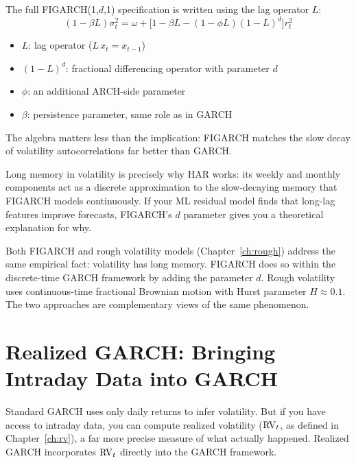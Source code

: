 The full FIGARCH(1,$d$,1) specification is written using the lag operator $L$:
%
\begin{equation}
\label{eq:figarch}
(1 - \beta L)\sigma^2_t
  = \omega + \bigl[1 - \beta L - (1 - \phi L)(1 - L)^d\bigr] r^2_t
\end{equation}
%
\begin{itemize}[nosep]
  \item $L$: lag operator ($L \, x_t = x_{t-1}$)
  \item $(1-L)^d$: fractional differencing operator with parameter $d$
  \item $\phi$: an additional ARCH-side parameter
  \item $\beta$: persistence parameter, same role as in GARCH
\end{itemize}

The algebra matters less than the implication: FIGARCH matches the slow decay
of volatility autocorrelations far better than GARCH.

\begin{projectconnection}
Long memory in volatility is precisely why HAR works: its weekly and monthly
components act as a discrete approximation to the slow-decaying memory that FIGARCH
models continuously. If your ML residual model finds that long-lag features improve
forecasts, FIGARCH's $d$ parameter gives you a theoretical explanation for why.
\end{projectconnection}

\begin{keyidea}
Both FIGARCH and rough volatility models (Chapter~\ref{ch:rough}) address the same
empirical fact: volatility has long memory. FIGARCH does so within the discrete-time
GARCH framework by adding the parameter $d$. Rough volatility uses continuous-time
fractional Brownian motion with Hurst parameter $H \approx 0.1$. The two approaches
are complementary views of the same phenomenon.
\end{keyidea}


\section{Realized GARCH: Bringing Intraday Data into GARCH}
\label{sec:realized-garch}

Standard GARCH uses only daily returns to infer volatility. But if you have access
to intraday data, you can compute realized volatility ($\operatorname{RV}_t$, as defined in
Chapter~\ref{ch:rv}), a far more precise measure of what actually happened. Realized
GARCH incorporates $\operatorname{RV}_t$ directly into the GARCH framework.

